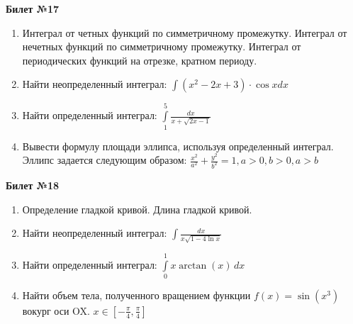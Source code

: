 \documentclass[a4paper, 12pt]{article}
\begin{document}
\begin{center}
	\textbf{Билет №17}
\end{center}
\begin{enumerate}
	\item Интеграл от четных функций по симметричному промежутку.
	Интеграл от нечетных функций по симметричному промежутку.
	Интеграл от периодических функций на отрезке, кратном периоду.
	\item Найти неопределенный интеграл: $\displaystyle \int{(x^2 - 2x + 3) \cdot \cos x dx}$
	\item Найти определенный интеграл: $\displaystyle \int\limits_{1}^{5} \frac{dx}{x + \sqrt{2x - 1}}$	\item Вывести формулу площади эллипса, используя определенный интеграл. Эллипс задается следующим образом: $\displaystyle \frac{x^2}{a^2} + \frac{y^2}{b^2} = 1, a > 0, b > 0, a > b$
\end{enumerate}

\begin{center}
	\textbf{Билет №18}
\end{center}
\begin{enumerate}
	\item Определение гладкой кривой. Длина гладкой кривой.
	\item Найти неопределенный интеграл: $\displaystyle \int{\frac{dx}{x \sqrt{1 - 4 \ln x}}}$
	\item Найти определенный интеграл: $\displaystyle \int\limits_{0}^{1} x \arctan(x)\,dx$
	\item Найти объем тела, полученного вращением функции $f(x) = \sin(x^3)$ вокург оси OX. $x\in\left[-\frac{\pi}{4},\frac{\pi}{4}\right]$ 
\end{enumerate}
\end{document}
